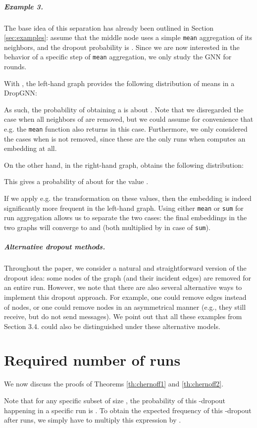 \documentclass{article}
\begin{document}
\subparagraph*{Example 3.} The base idea of this separation has already been outlined in Section \ref{sec:examples}: assume that the middle node  uses a simple \texttt{mean} aggregation of its neighbors, and the dropout probability is . Since we are now interested in the behavior of a specific step of \texttt{mean} aggregation, we only study the GNN for  rounds.

With , the left-hand graph provides the following distribution of means in a DropGNN:

As such, the probability of obtaining a  is about . Note that we disregarded the case when all neighbors of  are removed, but we could assume for convenience that e.g. the \texttt{mean} function also returns  in this case. Furthermore, we only considered the cases when  is not removed, since these are the only runs when  computes an embedding at all.

On the other hand, in the right-hand graph,  obtains the following distribution:


This gives a probability of about  for the value .

If we apply e.g. the transformation  on these values, then the embedding  is indeed significantly more frequent in the left-hand graph. Using either \texttt{mean} or \texttt{sum} for run aggregation allows us to separate the two cases: the final embeddings in the two graphs will converge to  and  (both multiplied by  in case of \texttt{sum}).

\subparagraph*{Alternative dropout methods.} Throughout the paper, we consider a natural and straightforward version of the dropout idea: some nodes of the graph (and their incident edges) are removed for an entire run. However, we note that there are also several alternative ways to implement this dropout approach. For example, one could remove edges instead of nodes, or one could remove nodes in an asymmetrical manner (e.g., they still receive, but do not send messages). We point out that all these examples from Section 3.4. could also be distinguished under these alternative models.

\section{Required number of runs} \label{app:Chernoff}

We now discuss the proofs of Theorems \ref{th:chernoff1} and \ref{th:chernoff2}.

Note that for any specific subset  of size , the probability of this -dropout happening in a specific run is . To obtain the expected frequency  of this -dropout after  runs, we simply have to multiply this expression by .
\end{document}
